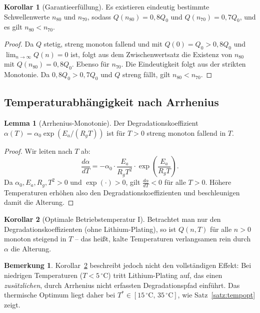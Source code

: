﻿\documentclass[a4paper,12pt]{article}
\theoremstyle{definition}
\newtheorem{lemma}{Lemma}
\newtheorem{korollar}{Korollar}
\newtheorem{bemerkung}{Bemerkung}
\begin{document}
\begin{korollar}[Garantieerf\"ullung]
\label{kor:garantie}
  Es existieren eindeutig bestimmte Schwellenwerte $n_{80}$ und $n_{70}$,
  sodass $Q(n_{80}) = 0{,}8 Q_0$ und $Q(n_{70}) = 0{,}7 Q_0$, und
  es gilt $n_{80} < n_{70}$.
\end{korollar}

\begin{proof}
  Da $Q$ stetig, streng monoton fallend und mit $Q(0) = Q_0 > 0{,}8 Q_0$
  und $\lim_{n\to\infty} Q(n) = 0$ ist, folgt aus dem Zwischenwertsatz
  die Existenz von $n_{80}$ mit $Q(n_{80}) = 0{,}8 Q_0$.
  Ebenso f\"ur $n_{70}$.
  Die Eindeutigkeit folgt aus der strikten Monotonie.
  Da $0{,}8 Q_0 > 0{,}7 Q_0$ und $Q$ streng f\"allt, gilt $n_{80} < n_{70}$.
\end{proof}

\subsection{Temperaturabh\"angigkeit nach Arrhenius}

\begin{lemma}[Arrhenius-Monotonie]
\label{lem:arrhenius}
  Der Degradationskoeffizient $\alpha(T) = \alpha_0 \exp(E_a/(R_g T))$ ist
  f\"ur $T > 0$ streng monoton fallend in $T$.
\end{lemma}

\begin{proof}
  Wir leiten nach $T$ ab:
  \[
    \frac{d\alpha}{dT} = -\alpha_0 \cdot \frac{E_a}{R_g T^2} \cdot
      \exp\!\left(\frac{E_a}{R_g T}\right).
  \]
  Da $\alpha_0, E_a, R_g, T^2 > 0$ und $\exp(\cdot) > 0$, gilt
  $\frac{d\alpha}{dT} < 0$ f\"ur alle $T > 0$.
  H\"ohere Temperaturen erh\"ohen also den Degradationskoeffizienten
  und beschleunigen damit die Alterung.
\end{proof}

\begin{korollar}[Optimale Betriebstemperatur I]
\label{kor:temp}
  Betrachtet man nur den Degradationskoeffizienten (ohne Lithium-Plating),
  so ist $Q(n, T)$ f\"ur alle $n > 0$ monoton steigend in $T$ --
  das hei\ss{}t, kalte Temperaturen verlangsamen rein durch $\alpha$ die Alterung.
\end{korollar}

\begin{bemerkung}
  Korollar~\ref{kor:temp} beschreibt jedoch nicht den vollst\"andigen Effekt:
  Bei niedrigen Temperaturen ($T < 5\,^{\circ}\mathrm{C}$) tritt Lithium-Plating auf,
  das einen \emph{zus\"atzlichen}, durch Arrhenius nicht erfassten
  Degradationspfad einf\"uhrt. Das thermische Optimum liegt daher bei
  $T^* \in [15\,^{\circ}\mathrm{C},\,35\,^{\circ}\mathrm{C}]$, wie Satz~\ref{satz:tempopt} zeigt.
\end{bemerkung}
\end{document}
